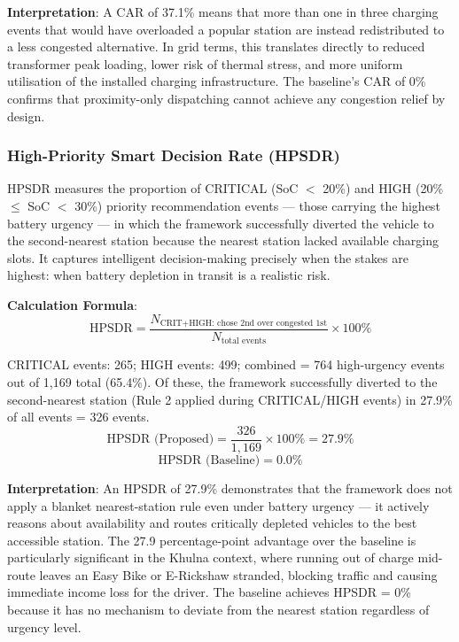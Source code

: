 \documentclass[conference]{IEEEtran}
\begin{document}
\textbf{Interpretation}: A CAR of 37.1\% means that more than one in
three charging events that would have overloaded a popular station are
instead redistributed to a less congested alternative. In grid terms,
this translates directly to reduced transformer peak loading, lower risk
of thermal stress, and more uniform utilisation of the installed
charging infrastructure. The baseline's CAR of 0\% confirms that
proximity-only dispatching cannot achieve any congestion relief by
design.

\subsubsection{High-Priority Smart Decision Rate (HPSDR)}
 HPSDR measures the proportion of CRITICAL
(SoC $<$ 20\%) and HIGH (20\% $\leq$ SoC $<$ 30\%) priority
recommendation events --- those carrying the highest battery urgency ---
in which the framework successfully diverted the vehicle to the
second-nearest station because the nearest station lacked available
charging slots. It captures intelligent decision-making precisely when
the stakes are highest: when battery depletion in transit is a realistic
risk.

\textbf{Calculation Formula}:
\begin{equation}
  \text{HPSDR} =
    \frac{N_{\text{CRIT+HIGH: chose 2nd over congested 1st}}}
         {N_{\text{total events}}}
    \times 100\%
  \label{eq:hpsdr}
\end{equation}

CRITICAL events: 265; HIGH events: 499; combined = 764 high-urgency
events out of 1,169 total (65.4\%). Of these, the framework
successfully diverted to the second-nearest station (Rule 2 applied
during CRITICAL/HIGH events) in 27.9\% of all events = 326 events.
\begin{equation}
  \text{HPSDR (Proposed)} = \frac{326}{1{,}169} \times 100\% = 27.9\%
  \label{eq:hpsdr_prop}
\end{equation}
\begin{equation}
  \text{HPSDR (Baseline)} = 0.0\%
  \label{eq:hpsdr_base}
\end{equation}

\textbf{Interpretation}: An HPSDR of 27.9\% demonstrates that the
framework does not apply a blanket nearest-station rule even under
battery urgency --- it actively reasons about availability and routes
critically depleted vehicles to the best accessible station. The 27.9
percentage-point advantage over the baseline is particularly significant
in the Khulna context, where running out of charge mid-route leaves an
Easy Bike or E-Rickshaw stranded, blocking traffic and causing immediate
income loss for the driver. The baseline achieves HPSDR = 0\% because
it has no mechanism to deviate from the nearest station regardless of
urgency level.
\end{document}
